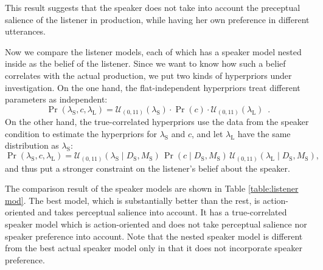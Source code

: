 This result suggests that the speaker does not take into account the preceptual salience of the listener in production, while having her own preference in different utterances. 


Now we compare the listener models, each of which has a speaker model nested inside as the belief of the listener. Since we want to know how such a belief correlates with the actual production, we put two kinds of hyperpriors under investigation. On the one hand, the flat-independent hyperpriors treat different parameters as  independent:
\begin{equation}\label{hyper-listener-independent}
\Pr(\lambda_\mathrm{S},c,\lambda_\mathrm{L})=\mathcal{U}_{(0,11)}(\lambda_\mathrm{S}) \cdot \Pr(c) \cdot  \mathcal{U}_{(0,11)}( \lambda_\mathrm{L}) \enspace .
\end{equation}
On the other hand, the true-correlated hyperpriors use the data from the speaker condition to estimate the hyperpriors for $\lambda_\mathrm{S}$ and $c$, and let $\lambda_\mathrm{L}$ have the same distribution as $\lambda_\mathrm{S}$:
\begin{equation}\label{hyper-listener-independent}
\Pr(\lambda_\mathrm{S},c,\lambda_\mathrm{L})=\mathcal{U}_{(0,11)}(\lambda_\mathrm{S} \mid D_\mathrm{S}, M_\mathrm{S}) \,\Pr(c\mid D_\mathrm{S}, M_\mathrm{S})  \,\mathcal{U}_{(0,11)}( \lambda_\mathrm{L} \mid D_\mathrm{S}, M_\mathrm{S}),
\end{equation}
and thus put a stronger constraint on the listener's belief about the speaker. 

The comparison result of the speaker models are shown in Table \ref{table:listener mod}. The best model, which is substantially better than the rest, is action-oriented and takes perceptual salience into account. It has a true-correlated speaker model which is action-oriented and does not take perceptual salience nor speaker preference into account. Note that the nested speaker model is different from the best actual speaker model only in that it does not incorporate speaker preference.  

